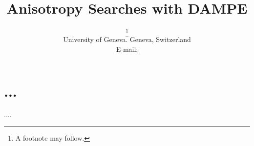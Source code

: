 \documentclass{PoS}
\title{Anisotropy Searches with DAMPE}
\author{\speaker{Maria Munoz}\thanks{A footnote may follow.}\\
        University of Geneva. Geneva, Switzerland\\
        E-mail: \email{maria.munoz@unige.ch}}
\begin{document}
\section{...}

\begin{thebibliography}{99}
....

\end{thebibliography}
\end{document}
